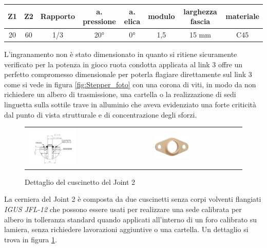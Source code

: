 \documentclass[%
corpo=11pt,
twoside,
 stile=classica,
oldstyle,
greek,%
]{toptesi}
\begin{document}
			\begin{tabular}{|c|c|c|c|c|c|c|c|}
			
			\hline
			Z1 & Z2 & Rapporto & a. pressione & a. elica & modulo & larghezza fascia & materiale \\
			\hline
			20 & 60 & 1/3 & 20° & 0°  & 1,5 & 15 mm & C45  \\
			\hline
			
		\end{tabular}
		
		L'ingranamento non è stato dimensionato in quanto si ritiene sicuramente verificato per la potenza in gioco  ruota condotta applicata al link 3 offre un perfetto compromesso dimensionale per poterla flagiare direttamente sul link 3 come si vede in figura \ref{fig:Stepper_foto} con una corona di viti, in modo da non richiedere un albero di trasmissione, una cartella o la realizzazione di sedi linguetta sulla sottile trave in alluminio che aveva evidenziato una forte criticità dal punto di vista strutturale e di concentrazione degli sforzi. \\
		
		\begin{figure} [!ht]
		\centering
			\begin{tabular}{ll}
				\includegraphics[width=0.4\textwidth]{Screen/cuscinetto.png}
				&
				\includegraphics[width=0.4\textwidth]{image/jfl12.jpg}
			\end{tabular}				
		\caption{Dettaglio del cuscinetto del Joint 2}
		\label{fig:cuscinetto_foto}
		\end{figure}		
		
		La cerniera del Joint 2 è composta da due cuscinetti senza corpi volventi flangiati \textit{IGUS JFL-12} che possono essere usati per realizzare una sede calibrata per albero in tolleranza standard quando applicati all'interno di un foro calibrato su lamiera, senza richiedere lavorazioni aggiuntive o una cartella. Un dettaglio si trova in figura \ref{fig:cuscinetto_foto}.
	
\end{document}
